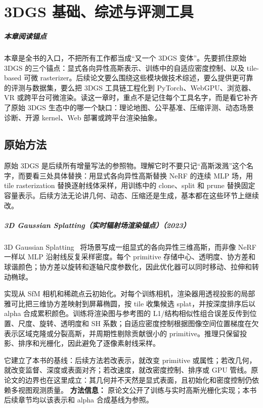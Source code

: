 \chapter{3DGS 基础、综述与评测工具}

\paragraph*{本章阅读锚点}
本章是全书的入口，不把所有工作都当成“又一个 3DGS 变体”。先要抓住原始 3DGS 的三个锚点：显式各向异性高斯表示、训练中的自适应密度控制、以及 tile-based 可微 rasterizer。后续论文要么围绕这些模块做技术综述，要么提供更可靠的评测与数据集，要么把 3DGS 工具链工程化到 PyTorch、WebGPU、浏览器、VR 或跨平台可微渲染。读这一章时，重点不是记住每个工具名字，而是看它补齐了原始 3DGS 生态中的哪一个缺口：理论地图、公平基准、压缩评测、动态场景诊断、开源 kernel、Web 部署或跨平台渲染抽象。

\section{原始方法}

原始 3DGS 是后续所有增量写法的参照物。理解它时不要只记“高斯泼溅”这个名字，而要看三处具体替换：用显式各向异性高斯替换 NeRF 的连续 MLP 场，用 tile rasterization 替换逐射线体采样，用训练中的 clone、split 和 prune 替换固定容量表示。后续方法无论讲几何、动态、压缩还是生成，基本都在这些环节上继续改。

\paragraph{3D Gaussian Splatting（实时辐射场渲染锚点）（2023）}
3D Gaussian Splatting~\cite{2308_04079} 将场景写成一组显式的各向异性三维高斯，而非像 NeRF 一样以 MLP 沿射线反复采样密度。每个 primitive 存储中心、透明度、协方差和球谐颜色；协方差以旋转和逐轴尺度参数化，因此优化器可以同时移动、拉伸和转动椭球。

实现从 SfM 相机和稀疏点云初始化。对每个训练相机，渲染器用透视投影的局部雅可比把三维协方差映射到屏幕椭圆，按 tile 收集候选 splat，并按深度排序后以 alpha 合成累积颜色。训练将渲染图与参考图的 L1/结构相似性组合误差反传到位置、尺度、旋转、透明度和 SH 系数；自适应密度控制根据图像空间位置梯度在欠表示区域克隆或分裂高斯，并周期性剔除贡献很小的 primitive。推理只保留投影、排序和光栅化，因此避免了逐像素射线采样。

它建立了本书的基线：后续方法若改表示，就改变 primitive 或属性；若改几何，就改变监督、深度或表面对齐；若改速度，就改密度控制、排序或 GPU 管线。原论文的边界也在这里成立：其几何并不天然是显式表面，且初始化和密度控制仍依赖多视图观测质量。
\textbf{方法信息：} 原论文公开了训练与实时高斯光栅化实现；本书后续章节均以该表示和 alpha 合成基线为参照。
